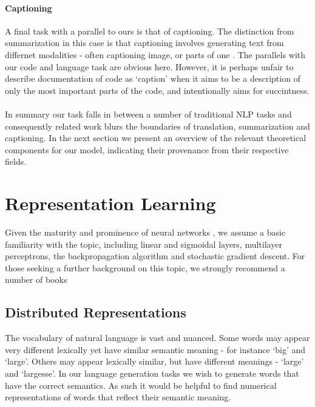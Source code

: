 \paragraph{Captioning}
A final task with a parallel to ours is that of captioning. 
The distinction from summarization in this case is that captioning involves generating text from differnet modalities - often captioning image, \citep{Vinyals2015ShowAT} or parts of one \citep{Karpathy2015DeepVA}.
The parallels with our code and language task are obvious here. However, it is perhaps unfair to describe documentation of code as `caption' when it aims to be a description of only the most important parts of the code, and intentionally aims for succintness.

\paragraph{}
In summary our task falls in between a number of traditional NLP tasks and consequently related work blurs the boundaries of translation, summarization and captioning. In the next section we present an overview of the relevant theoretical components for our model, indicating their provenance from their respective fields. 

\section{Representation Learning}

Given the maturity and prominence of neural networks 
, we assume a basic familiarity with the topic, including linear and sigmoidal layers, multilayer perceptrons, the backpropagation algorithm and stochastic gradient descent. For those seeking a further background on this topic, we strongly recommend a number of books \cite{nielsenneural} \cite{Goodfellow:2016:DL:3086952} 



\subsection{Distributed Representations} %
\label{sub:embeddings}

The vocabulary of natural language is vast and nuanced. 
Some words may appear very different lexically yet have similar semantic meaning - for instance `big' and `large'.
Others may appear lexically similar, but have different meanings - `large' and `largesse'. 
In our language generation tasks we wish to generate words that have the correct semantics.
As such it would be helpful to find numerical representations of words that reflect their semantic meaning. 

